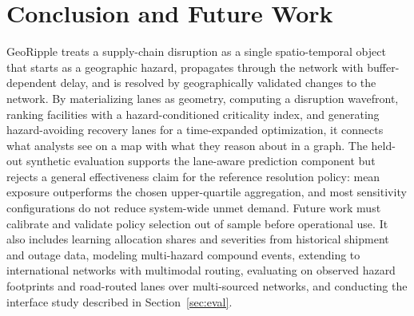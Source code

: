 \documentclass[conference]{IEEEtran}
\begin{document}
\section{Conclusion and Future Work}
GeoRipple treats a supply-chain disruption as a single spatio-temporal
object that starts as a geographic hazard, propagates through the network
with buffer-dependent delay, and is resolved by geographically validated
changes to the network. By materializing lanes as geometry, computing a
disruption wavefront, ranking facilities with a hazard-conditioned
criticality index, and generating hazard-avoiding recovery lanes for a
time-expanded optimization, it connects what analysts see on a map with
what they reason about in a graph. The held-out synthetic evaluation supports
the lane-aware prediction component but rejects a general effectiveness claim
for the reference resolution policy: mean exposure outperforms the chosen
upper-quartile aggregation, and most sensitivity configurations do not reduce
system-wide unmet demand. Future work must calibrate and validate policy
selection out of sample before operational use. It also includes learning
allocation shares and severities from historical shipment and outage
data, modeling multi-hazard compound events, extending to international
networks with multimodal routing, evaluating on observed hazard
footprints and road-routed lanes over multi-sourced networks, and
conducting the interface study described in Section~\ref{sec:eval}.
\end{document}
